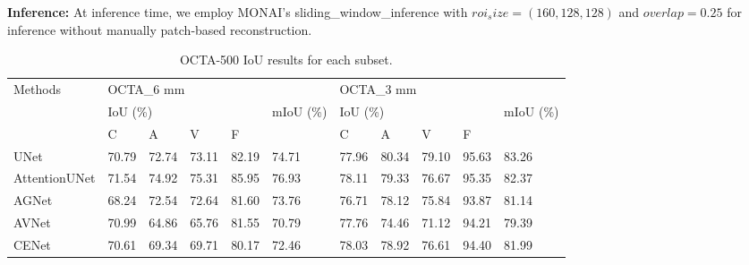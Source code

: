 \documentclass[times, review, 10pt]{elsarticle}
\begin{document}
\begin{CJK}{UTF8}{gbsn}
\par
\textbf{Inference:} At inference time, we employ MONAI's sliding\_window\_inference with $roi_size=(160, 128, 128)$ and $overlap=0.25$ for inference without manually patch-based reconstruction.
\color{black}

\begin{table}[htb]
\centering
\caption{OCTA-500 IoU results for each subset.}
\label{tab1}
\renewcommand{\arraystretch}{1} %
\setlength{\tabcolsep}{3.2pt}
\small
\begin{tabular}{lllllllllll} 
\toprule
\multirow{3}{*}{Methods} & \multicolumn{5}{l}{OCTA\_6 mm}                                     & \multicolumn{5}{l}{OCTA\_3 mm}                                      \\ 
\cline{2-5}\cline{7-10}
                         & \multicolumn{4}{l}{IoU (\%)} & \multirow{2}{*}{mIoU (\%)} & \multicolumn{4}{l}{IoU (\%)} & \multirow{2}{*}{mIoU (\%)}  \\ 
\cline{2-5}\cline{7-10}
                         & C     & A     & V     & F             &                                     & C     & A     & V     & F             &                                      \\ 
\hline
UNet                     & 70.79 & 72.74 & 73.11 & 82.19         & 74.71                               & 77.96 & 80.34 & 79.10 & 95.63         & 83.26\textbf{}                       \\
AttentionUNet            & 71.54 & 74.92 & 75.31 & 85.95         & 76.93                               & 78.11 & 79.33 & 76.67 & 95.35         & 82.37\textbf{}                       \\
AGNet                    & 68.24 & 72.54 & 72.64 & 81.60         & 73.76                               & 76.71 & 78.12 & 75.84 & 93.87         & 81.14\textbf{}                       \\
AVNet                    & 70.99 & 64.86 & 65.76 & 81.55         & 70.79                               & 77.76 & 74.46 & 71.12 & 94.21         & 79.39\textbf{}                       \\
CENet                    & 70.61 & 69.34 & 69.71 & 80.17         & 72.46                               & 78.03 & 78.92 & 76.61 & 94.40         & 81.99\textbf{}                       \\

\end{tabular}
\end{table}
\end{CJK}
\end{document}
